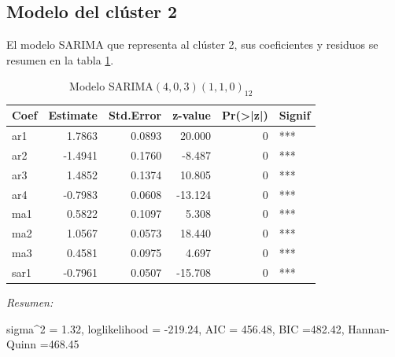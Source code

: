 \documentclass[12pt,oneside]{book}\usepackage[]{graphicx}\usepackage[]{color}
\newenvironment{knitrout}{}{} %
\theoremstyle{definition} %
\begin{document}
\subsection{Modelo del clúster 2}


El modelo SARIMA que representa al clúster 2, sus coeficientes y residuos se resumen en la tabla \ref{tab:sarima_cl2}.


\begin{knitrout}
\color{fgcolor}\begin{table}

\caption{\label{tab:unnamed-chunk-78}\label{tab:sarima_cl2}Modelo SARIMA$(4,0,3)(1,1,0)_{12}$}
\centering
\begin{threeparttable}
\begin{tabular}[t]{lrrrrl}
\toprule
Coef & Estimate & Std.Error & z-value & Pr(>|z|) & Signif\\
\midrule
\rowcolor{gray!6}  ar1 & 1.7863 & 0.0893 & 20.000 & 0 & ***\\
ar2 & -1.4941 & 0.1760 & -8.487 & 0 & ***\\
\rowcolor{gray!6}  ar3 & 1.4852 & 0.1374 & 10.805 & 0 & ***\\
ar4 & -0.7983 & 0.0608 & -13.124 & 0 & ***\\
\rowcolor{gray!6}  ma1 & 0.5822 & 0.1097 & 5.308 & 0 & ***\\
\addlinespace
ma2 & 1.0567 & 0.0573 & 18.440 & 0 & ***\\
\rowcolor{gray!6}  ma3 & 0.4581 & 0.0975 & 4.697 & 0 & ***\\
sar1 & -0.7961 & 0.0507 & -15.708 & 0 & ***\\
\bottomrule
\end{tabular}
\begin{tablenotes}
\item \textit{Resumen:} 
\item sigma\textasciicircum{}2 = 1.32, loglikelihood = -219.24, AIC = 456.48, BIC =482.42, Hannan-Quinn =468.45
\end{tablenotes}
\end{threeparttable}
\end{table}


\end{knitrout}
\end{document}
